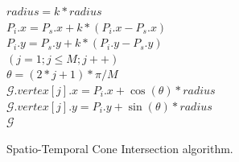 \begin{figure}[tb!]
\begin{center}
{\begin{minipage}{3.36in}
{	\icc \hspace{1ex} $radius = k*radius$  \\
	\icc \hspace{1ex} $P_i.x = P_s.x + k*(P_i.x-P_s.x)$ \\
	\icc \hspace{1ex} $P_i.y = P_s.y + k*(P_i.y-P_s.y)$ \\
	\icc \hspace{1ex} \For $(j = 1;j \le M;j++)$ \\
	\icc \> \hspace{3ex} $\theta =  (2 * j + 1)*\pi /M $ \\
	\icc \> \hspace{3ex} $\mathcal{G}.vertex[j].x = P_i.x + \cos(\theta) * radius$\\
	\icc \> \hspace{3ex} $\mathcal{G}.vertex[j].y = P_i.y + \sin(\theta) * radius$\\
	\icc \hspace{1ex}\Return $\mathcal{G}$
}
\vspace{-2ex}
\myhrule
\end{minipage}
}
\end{center}
\vspace{-2ex}
\caption{\small Spatio-Temporal Cone Intersection algorithm.}
\label{alg:CI3d}
\vspace{-2ex}
\end{figure}






